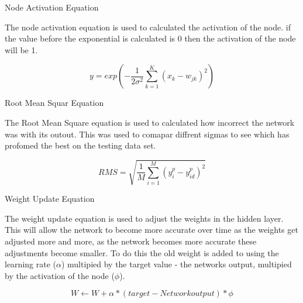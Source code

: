\documentclass{IEEEtran}
\begin{document}
\begin{center}
  Node Activation Equation
\end{center}
\begin{flushleft}
  The node activation equation is used to calculated the activation of the node. if the value before
  the exponential is calculated is 0 then the activation of the node will be 1.
\end{flushleft}
$$y=exp(-\frac{1}{2\sigma^2} \sum_{k=1}^{K}(x_{k} - w_{jk})^2) $$
\begin{center}
  Root Mean Squar Equation
\end{center}
\begin{flushleft}
  The Root Mean Square equation is used to calculated how incorrect the network was with its outout. This was
  used to comapar diffrent sigmas to see which has profomed the best on the testing data set.
\end{flushleft}
$$RMS =\sqrt{\frac{1}{M}\sum_{i=1}^{M}(y^{p}_{i} - y^{p}_{id})^2} $$
\begin{center}
Weight Update Equation
\end{center}
\begin{flushleft}
  The weight update equation is used to adjust the weights in the hidden layer. This will allow the network to
  become more accurate over time as the weights get adjusted more and more, as the network becomes more accurate
  these adjustments become smaller. To do this the old weight is added to using the learning rate ($\alpha$) multipied
  by the target value - the networks output, multipied by the activation of the node ($\phi$).
\end{flushleft}
$$ W  \leftarrow W + \alpha *(target - Network output)*\phi$$
\end{document}
